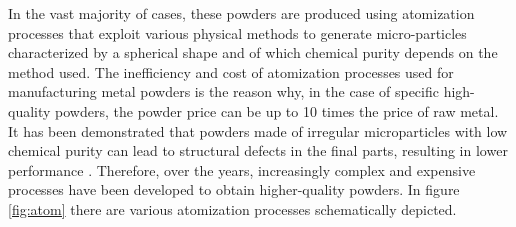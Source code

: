 In the vast majority of cases, these powders are produced using atomization processes that exploit various physical methods to generate micro-particles characterized by a spherical shape and of which chemical purity depends on the method used. The inefficiency and cost of atomization processes used for manufacturing metal powders is the reason why, in the case of specific high-quality powders, the powder price can be up to 10 times the price of raw metal. It has been demonstrated that powders made of irregular microparticles with low chemical purity can lead to structural defects in the final parts, resulting in lower performance \cite{deng_origin_2020}. Therefore, over the years, increasingly complex and expensive processes have been developed to obtain higher-quality powders. In figure \ref{fig:atom} there are various atomization processes schematically depicted.
